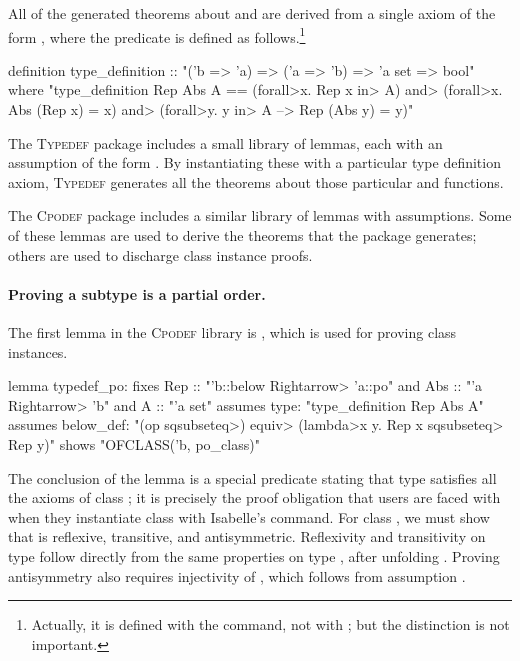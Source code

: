 All of the generated theorems about  and  are derived from a single axiom of the form , where the  predicate is defined as follows.\footnote{Actually, it is defined with the  command, not with ; but the distinction is not important.}

\begin{isacode}
definition type_definition :: "('b => 'a) => ('a => 'b) => 'a set => bool"
  where "type_definition Rep Abs A ==
  (\<forall>x. Rep x \<in> A) \<and> (\<forall>x. Abs (Rep x) = x) \<and> (\<forall>y. y \<in> A --> Rep (Abs y) = y)"
\end{isacode}

\noindent
The \textsc{Typedef} package includes a small library of lemmas, each with an assumption of the form . By instantiating these with a particular type definition axiom, \textsc{Typedef} generates all the theorems about those particular  and  functions.

The \textsc{Cpodef} package includes a similar library of lemmas with  assumptions. Some of these lemmas are used to derive the theorems that the package generates; others are used to discharge class instance proofs.

\paragraph{Proving a subtype is a partial order.} The first lemma in the \textsc{Cpodef} library is , which is used for proving  class instances.

\begin{isacode}
lemma typedef_po:
  fixes Rep :: "'b::below \<Rightarrow> 'a::po" and Abs :: "'a \<Rightarrow> 'b" and A :: "'a set"
  assumes type: "type_definition Rep Abs A"
  assumes below_def: "(op \<sqsubseteq>) \<equiv> (\<lambda>x y. Rep x \<sqsubseteq> Rep y)"
  shows "OFCLASS('b, po_class)"
\end{isacode}

\noindent
The conclusion of the lemma is a special predicate stating that type  satisfies all the axioms of class ; it is precisely the proof obligation that users are faced with when they instantiate class  with Isabelle's  command. For class , we must show that  is reflexive, transitive, and antisymmetric. Reflexivity and transitivity on type  follow directly from the same properties on type , after unfolding . Proving antisymmetry also requires injectivity of , which follows from assumption .

